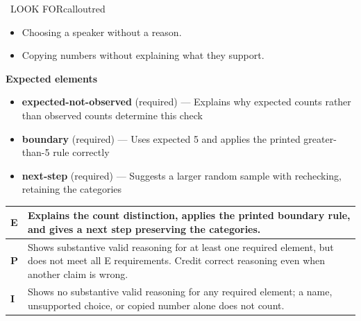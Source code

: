\documentclass[11pt]{article}
\begin{document}
\begin{callout}{\IconWarn\ LOOK FOR}{calloutred}
\begin{itemize}[leftmargin=1.5em,itemsep=2pt,topsep=2pt]
  \item Choosing a speaker without a reason.
  \item Copying numbers without explaining what they support.
\end{itemize}
\end{callout}


\textbf{Expected elements}
\begin{itemize}[leftmargin=1.5em,itemsep=2pt,topsep=2pt]
  \item \textbf{expected-not-observed} (required) --- Explains why expected counts rather than observed counts determine this check
  \item \textbf{boundary} (required) --- Uses expected 5 and applies the printed greater-than-5 rule correctly
  \item \textbf{next-step} (required) --- Suggests a larger random sample with rechecking, retaining the categories
\end{itemize}

{\small\renewcommand{\arraystretch}{1.25}
\noindent\begin{tabular}{|p{0.5in}|p{5.9in}|}
\hline
\textbf{E} & Explains the count distinction, applies the printed boundary rule, and gives a next step preserving the categories. \\ \hline
\textbf{P} & Shows substantive valid reasoning for at least one required element, but does not meet all E requirements. Credit correct reasoning even when another claim is wrong. \\ \hline
\textbf{I} & Shows no substantive valid reasoning for any required element; a name, unsupported choice, or copied number alone does not count. \\ \hline
\end{tabular}}

\clearpage
{}
\end{document}
